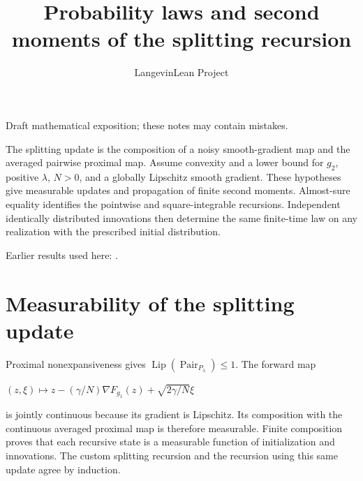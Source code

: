 \documentclass[11pt,a4paper]{article}
\title{\texorpdfstring{Probability laws and second moments of the splitting recursion}{Probability laws and second moments of the splitting recursion}}
\author{LangevinLean Project}
\date{}
\begin{document}
\maketitle
Draft mathematical exposition; these notes may contain mistakes.


The splitting update is the composition of a noisy smooth-gradient map and the averaged pairwise proximal map. Assume convexity and a lower bound for \(g_2\), positive \(\lambda\), \(N>0\), and a globally Lipschitz smooth gradient. These hypotheses give measurable updates and propagation of finite second moments. Almost-sure equality identifies the pointwise and square-integrable recursions. Independent identically distributed innovations then determine the same finite-time law on any realization with the prescribed initial distribution.



Earlier results used here: \cite[Section~3.20]{LangevinLean2026ULASC}.

\section{\texorpdfstring{Measurability of the splitting update}{Measurability of the splitting update}}


Proximal nonexpansiveness gives \(\operatorname{Lip}(\operatorname{Pair}_{P_\lambda})\le1\). The forward map



\((z,\xi)\mapsto z-(\gamma/N)\nabla F_{g_1}(z)+\sqrt{2\gamma/N}\xi\)



is jointly continuous because its gradient is Lipschitz. Its composition with the continuous averaged proximal map is therefore measurable. Finite composition proves that each recursive state is a measurable function of initialization and innovations. The custom splitting recursion and the recursion using this same update agree by induction.
\end{document}

